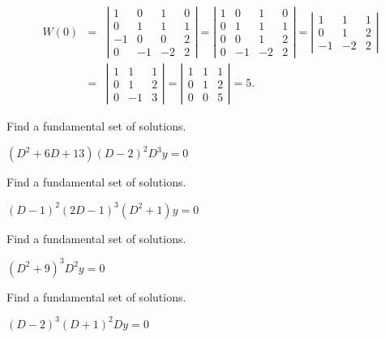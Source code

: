 \documentclass{ximera}
\begin{document}
\begin{problem}
\begin{enumerate}
\begin{solution}
\begin{eqnarray*}
W(0)&=&\left|\begin{array}{rrrr}
1&0&1&0\\0&1&1&1\\-1&0&0&2\\0&-1&-2&2
\end{array}\right|=
\left|\begin{array}{rrrr}
1&0&1&0\\0&1&1&1\\0&0&1&2\\0&-1&-2&2
\end{array}\right|=
\left|\begin{array}{rrrr}
1&1&1\\0&1&2\\-1&-2&2
\end{array}\right|\\
&=&\left|\begin{array}{rrrr}
1&1&1\\0&1&2\\0&-1&3
\end{array}\right|=
\left|\begin{array}{rrrr}
1&1&1\\0&1&2\\0&0&5
\end{array}\right|=5.
\end{eqnarray*}
\end{solution}

\end{enumerate}
\end{problem}

\begin{problem}\label{exer:9.2.29} Find a
fundamental set of solutions.

$(D^2+6D+13)(D-2)^2D^3y=0$
\end{problem}

\begin{problem}\label{exer:9.2.30} Find a
fundamental set of solutions.

$(D-1)^2(2D-1)^3(D^2+1)y=0$
\end{problem}

\begin{problem}\label{exer:9.2.31} Find a
fundamental set of solutions.

$(D^2+9)^3D^2y=0$
\end{problem}

\begin{problem}\label{exer:9.2.32}  Find a
fundamental set of solutions.

$(D-2)^3(D+1)^2Dy=0$
\end{problem}
\end{document}
